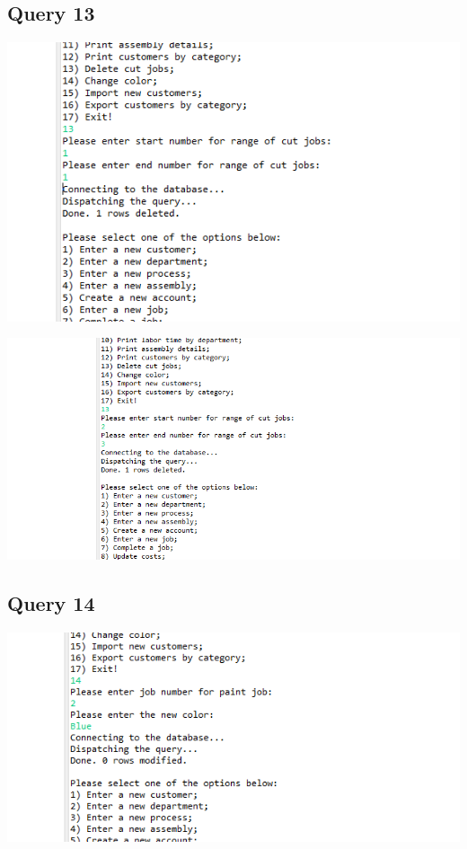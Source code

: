 \documentclass[11pt]{article}
\begin{document}
\subsection{Query 13}
\includegraphics[width = \textwidth]{deleteCut1.png}

\includegraphics[width = \textwidth]{deleteCut2.png}
\subsection{Query 14}
\includegraphics[width = \textwidth]{paintColor1.png}
\end{document}
